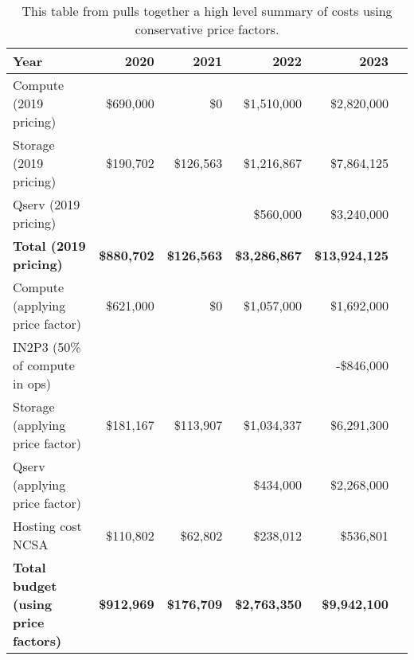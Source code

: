 \tiny \begin{longtable} { |p{}  |r  |r  |r  |r  |r |}
\caption{This table from pulls together a high level summary  of costs using conservative price factors.
 \label{tab:Summary}}\\
\hline
\textbf{Year}&\textbf{2020}&\textbf{2021}&\textbf{2022}&\textbf{2023} \\ \hline
{Compute (2019 pricing)}&{\$690,000}&{\$0}&{\$1,510,000}&{\$2,820,000} \\ \hline
{Storage (2019 pricing)}&{\$190,702}&{\$126,563}&{\$1,216,867}&{\$7,864,125} \\ \hline
{Qserv (2019 pricing)}&{}&{}&{\$560,000}&{\$3,240,000} \\ \hline
\textbf{Total (2019 pricing)}&\textbf{\$880,702}&\textbf{\$126,563}&\textbf{\$3,286,867}&\textbf{\$13,924,125} \\ \hline
{Compute (applying price factor)}&{\$621,000}&{\$0}&{\$1,057,000}&{\$1,692,000} \\ \hline
{IN2P3 (50\% of compute in ops)}&{}&{}&{}&{-\$846,000} \\ \hline
{Storage (applying price factor)}&{\$181,167}&{\$113,907}&{\$1,034,337}&{\$6,291,300} \\ \hline
{Qserv (applying price factor)}&{}&{}&{\$434,000}&{\$2,268,000} \\ \hline
{Hosting cost NCSA
}&{\$110,802}&{\$62,802}&{\$238,012}&{\$536,801} \\ \hline
\textbf{Total budget (using price factors)}&\textbf{\$912,969}&\textbf{\$176,709}&\textbf{\$2,763,350}&\textbf{\$9,942,100} \\ \hline
\end{longtable} \normalsize
